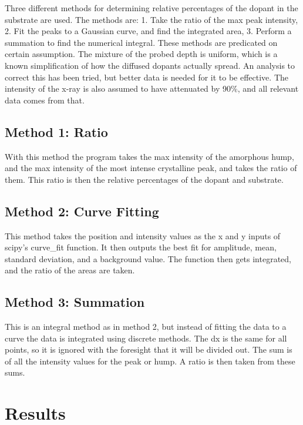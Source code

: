 \documentclass{article}
\begin{document}
    Three different methods for determining relative percentages of the dopant in the substrate are used. The methods are: 1. Take the ratio of the max peak intensity, 2. Fit the peaks to a Gaussian curve, and find the integrated area, 3. Perform a summation to find the numerical integral. These methods are predicated on certain assumption. The mixture of the probed depth is uniform, which is a known simplification of how the diffused dopants actually spread. An analysis to correct this has been tried, but better data is needed for it to be effective. The intensity of the x-ray is also assumed to have attenuated by 90\%, and all relevant data comes from that.

    \subsection*{Method 1: Ratio}

        With this method the program takes the max intensity of the amorphous hump, and the max intensity of the most intense crystalline peak, and takes the ratio of them. This ratio is then the relative percentages of the dopant and substrate.

    \subsection*{Method 2: Curve Fitting}

        This method takes the position and intensity values as the x and y inputs of scipy's curve\_fit function. It then outputs the best fit for amplitude, mean, standard deviation, and a background value. The function then gets integrated, and the ratio of the areas are taken.

    \subsection*{Method 3: Summation}

        This is an integral method as in method 2, but instead of fitting the data to a curve the data is integrated using discrete methods. The dx is the same for all points, so it is ignored with the foresight that it will be divided out. The sum is of all the intensity values for the peak or hump. A ratio is then taken from these sums.

\section{Results}
    
\end{document}
